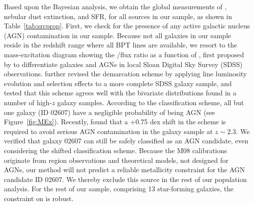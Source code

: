 Based upon the Bayesian analysis, we obtain the global measurements of \gpm, nebular dust extinction, and SFR, for all sources in
our sample, as shown in Table~\ref{tab:srcprop}. First, we check for the presence of any active galactic nucleus (AGN)
contamination in our sample. Because not all galaxies in our sample reside in the redshift range where all BPT lines are
available, we resort to the mass-excitation diagram showing the \OIII/\Hb flux ratio as a function of \Mstar, first proposed by
\citet{Juneau:2011fz} to differentiate \sf galaxies and AGNs in local Sloan Digital Sky Survey (SDSS) observations.
\citet{Juneau:2014ca} further revised the demarcation scheme by applying line luminosity evolution and selection effects to a more
complete SDSS galaxy sample, and tested that this scheme agrees well with the bivariate distributions found in a number of
high-$z$ galaxy samples.
According to the \citet{Juneau:2014ca} classification scheme, all but one galaxy (ID 02607) have a negligible probability of being
AGN (see Figure~\ref{fig:MEx}).
Recently, \citet{Coil:2015dp} found that a +0.75 dex \Mstar shift in the \citet{Juneau:2014ca} scheme is required to avoid serious
AGN contamination in the \mosdef galaxy sample at $z\sim2.3$.
We verified that galaxy 02607 can still be safely classified as an AGN candidate, even considering the \citet{Coil:2015dp} shifted
classification scheme.
Because the M08 calibrations originate from \HII region observations and theoretical models, not designed for AGNs, our method
will not predict a reliable metallicity constraint for the AGN candidate ID 02607. We thereby exclude this source in the rest of
our population analysis. For the rest of our sample, comprising 13 star-forming galaxies, the constraint on \gpm is robust.

